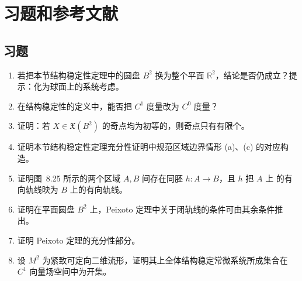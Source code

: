 \section*{习题和参考文献}

\subsection*{习题}
\begin{enumerate}
  \item 若把本节结构稳定性定理中的圆盘 $B^2$ 换为整个平面
  $\mathbb R^2$，结论是否仍成立？提示：化为球面上的系统考虑。
  \item 在结构稳定性的定义中，能否把 $C^1$ 度量改为 $C^0$ 度量？
  \item 证明：若 $X\in\mathfrak X(B^2)$ 的奇点均为初等的，则奇点只有有限个。
  \item 证明本节结构稳定性定理充分性证明中规范区域边界情形
  (a)、(c) 的对应构造。
  \item 证明图~8.25 所示的两个区域 $A,B$ 间存在同胚 $h:A\to B$，且 $h$ 把 $A$ 上
  的有向轨线映为 $B$ 上的有向轨线。
  \item 证明在平面圆盘 $B^2$ 上，Peixoto 定理中关于闭轨线的条件可由其余条件推出。
  \item 证明 Peixoto 定理的充分性部分。
  \item 设 $M^2$ 为紧致可定向二维流形，证明其上全体结构稳定常微系统所成集合在
  $C^1$ 向量场空间中为开集。
\end{enumerate}


